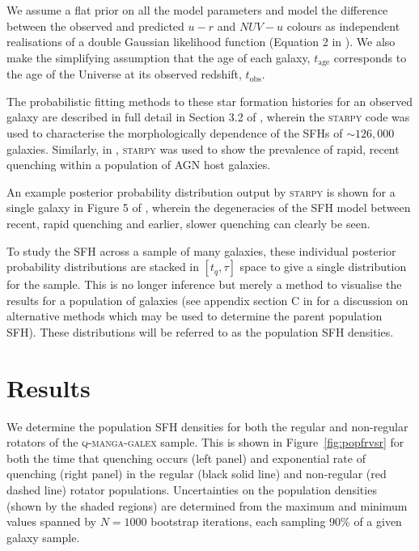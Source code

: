 \documentclass[useAMS,usenatbib]{mn2e}
\begin{document}
We assume a flat prior on all the model parameters and model the difference between the observed and predicted $u-r$ and $NUV-u$ colours as independent realisations of a double Gaussian likelihood function (Equation 2 in \citealt{smethurst15}). We also make the simplifying assumption that the age of each galaxy, $t_\mathrm{age}$ corresponds to the age of the Universe at its observed redshift, $t_\mathrm{obs}$.

The probabilistic fitting methods to these star formation histories for an observed galaxy are described in full detail in Section 3.2 of \cite{smethurst15}, wherein the \textsc{starpy} code was used to characterise the morphologically dependence of the SFHs of $\sim126,000$ galaxies. Similarly, in \cite{smethurst16}, \textsc{starpy} was used to show the prevalence of rapid, recent quenching within a population of AGN host galaxies. 


An example posterior probability distribution output by \textsc{starpy} is shown for a single galaxy in Figure 5 of \cite{smethurst15}, wherein the degeneracies of the SFH model between recent, rapid quenching and earlier, slower quenching can clearly be seen. 

To study the SFH across a sample of many galaxies, these individual posterior probability distributions are stacked in $[t_q, \tau]$ space to give a single distribution for the sample. This is no longer inference but merely a method to visualise the results for a population of galaxies (see appendix section C in \citealt{smethurst16} for a discussion on alternative methods which may be used to determine the parent population SFH). These distributions will be referred to as the population SFH densities.

\section{Results}\label{sec:results}

We determine the population SFH densities for both the regular and non-regular rotators of the \textsc{q-manga-galex} sample. This is shown in Figure~\ref{fig:popfrvsr} for both the time that quenching occurs (left panel) and exponential rate of quenching (right panel) in the regular (black solid line) and non-regular (red dashed line) rotator populations. Uncertainties on the population densities (shown by the shaded regions) are determined from the maximum and minimum values spanned by $N = 1000$ bootstrap iterations, each sampling $90\%$ of a given galaxy sample. 
\end{document}
